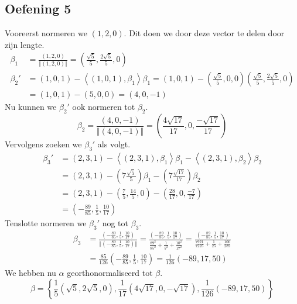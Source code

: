 \documentclass[lineaire_algebra_oplossingen.tex]{subfiles}
\begin{document}
\subsection{Oefening 5}
Vooreerst normeren we $(1,2,0)$. Dit doen we door deze vector te delen door zijn lengte.
\begin{align*}
\beta_1 &= \frac{(1,2,0)}{\Vert(1,2,0)\Vert}
= \left(\frac{\sqrt{5}}{5},\frac{2\sqrt{5}}{5},0\right) \\
\beta_2' &= (1,0,1) - \left\langle (1,0,1),\beta_1 \right\rangle \beta_1
= (1,0,1) - \left(\frac{\sqrt{5}}{5},0,0\right)\left(\frac{\sqrt{5}}{5},\frac{2\sqrt{5}}{5},0\right) \\
&= (1,0,1) - (5,0,0) = (4,0,-1)
\end{align*}
Nu kunnen we $\beta_2'$ ook normeren tot $\beta_2$.
\[
\beta_2 = \frac{(4,0,-1)}{\Vert (4,0,-1)\Vert}
= \left( \frac{4\sqrt{17}}{17},0,\frac{-\sqrt{17}}{17} \right)
\]
Vervolgens zoeken we $\beta_3'$ als volgt.
\begin{align*}
\beta_3'
&= (2,3,1)
- \left\langle (2,3,1),\beta_1\right\rangle\beta_1
- \left\langle (2,3,1),\beta_2\right\rangle\beta_2 \\
&= (2,3,1)
- \left(7\frac{\sqrt{5}}{5}\right)  \beta_1
- \left(7\frac{\sqrt{17}}{17} \right)  \beta_2 \\
&=(2,3,1)
- \left(\frac{7}{5},\frac{14}{5},0\right)
- \left( \frac{28}{17},0,\frac{-7}{17} \right) \\
&= \left(-\frac{89}{85},\frac{1}{5},\frac{10}{17}\right)
\end{align*}
Tenslotte normeren we $\beta_3'$ nog tot $\beta_3$.
\begin{align*}
\beta_3
&= 
\frac{\left(-\frac{89}{85},\frac{1}{5},\frac{10}{17}\right)}
{\Vert\left(-\frac{89}{85},\frac{1}{5},\frac{10}{17}\right)\Vert}
= 
\frac{\left(-\frac{89}{85},\frac{1}{5},\frac{10}{17}\right)}
{\frac{89^2}{85^2}+\frac{1}{5^2}+\frac{10^2}{17^2}}
=
\frac{\left(-\frac{89}{85},\frac{1}{5},\frac{10}{17}\right)}
{\frac{7921}{7225}+\frac{1}{25}+\frac{100}{289}} \\
&=
\frac{85}{126}
\left(-\frac{89}{85},\frac{1}{5},\frac{10}{17}\right)
=
\frac{1}{126}
\left(-89,17,50\right)
\end{align*}
We hebben nu $\alpha$ georthonormaliseerd tot $\beta$.
\[
\beta
=
\left\{
\frac{1}{5}
\left(\sqrt{5},2\sqrt{5},0\right)
,
\frac{1}{17}
\left( 4\sqrt{17},0,-\sqrt{17} \right)
,
\frac{1}{126}
\left(-89,17,50\right)
\right\}
\]
\end{document}
